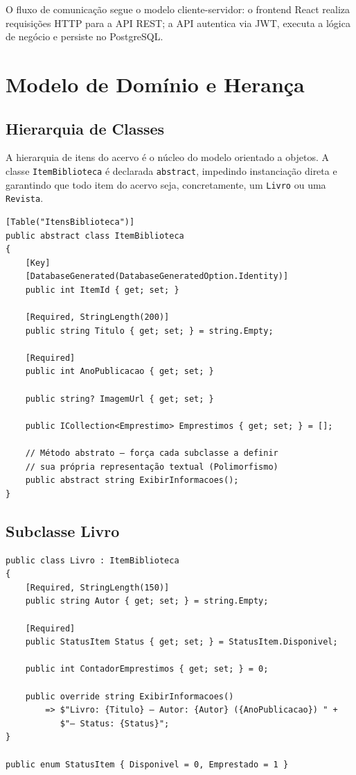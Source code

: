 \documentclass[
  12pt,
  a4paper,
  oneside,
  brazil
]{abntex2}
\begin{document}
O fluxo de comunicação segue o modelo cliente-servidor: o frontend React realiza requisições HTTP para a API REST; a API autentica via JWT, executa a lógica de negócio e persiste no PostgreSQL.

\section{Modelo de Domínio e Herança}

\subsection{Hierarquia de Classes}

A hierarquia de itens do acervo é o núcleo do modelo orientado a objetos. A classe \texttt{ItemBiblioteca} é declarada \texttt{abstract}, impedindo instanciação direta e garantindo que todo item do acervo seja, concretamente, um \texttt{Livro} ou uma \texttt{Revista}.

\begin{lstlisting}[style=csharp, caption={Classe abstrata ItemBiblioteca}, label=lst:item]
[Table("ItensBiblioteca")]
public abstract class ItemBiblioteca
{
    [Key]
    [DatabaseGenerated(DatabaseGeneratedOption.Identity)]
    public int ItemId { get; set; }

    [Required, StringLength(200)]
    public string Titulo { get; set; } = string.Empty;

    [Required]
    public int AnoPublicacao { get; set; }

    public string? ImagemUrl { get; set; }

    public ICollection<Emprestimo> Emprestimos { get; set; } = [];

    // Método abstrato — força cada subclasse a definir
    // sua própria representação textual (Polimorfismo)
    public abstract string ExibirInformacoes();
}
\end{lstlisting}

\subsection{Subclasse Livro}

\begin{lstlisting}[style=csharp, caption={Subclasse Livro com override polimórfico}, label=lst:livro]
public class Livro : ItemBiblioteca
{
    [Required, StringLength(150)]
    public string Autor { get; set; } = string.Empty;

    [Required]
    public StatusItem Status { get; set; } = StatusItem.Disponivel;

    public int ContadorEmprestimos { get; set; } = 0;

    public override string ExibirInformacoes()
        => $"Livro: {Titulo} — Autor: {Autor} ({AnoPublicacao}) " +
           $"— Status: {Status}";
}

public enum StatusItem { Disponivel = 0, Emprestado = 1 }
\end{lstlisting}
\end{document}
